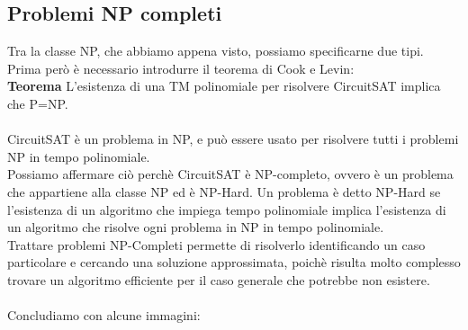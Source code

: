 \documentclass[]{article}
\begin{document}
		\subsection{Problemi NP completi}
			Tra la classe NP, che abbiamo appena visto, possiamo specificarne due tipi. Prima però è necessario introdurre il teorema di Cook e Levin:\\
			\textbf{Teorema} L'esistenza di una TM polinomiale per risolvere CircuitSAT implica che P=NP.\\\\
			CircuitSAT è un problema in NP, e può essere usato per risolvere tutti i problemi NP in tempo polinomiale.\\
			Possiamo affermare ciò perchè CircuitSAT è NP-completo, ovvero è un problema che appartiene alla classe NP ed è NP-Hard. Un problema è detto NP-Hard se l'esistenza di un algoritmo che impiega tempo polinomiale implica l'esistenza di un algoritmo che risolve ogni problema in NP in tempo polinomiale.\\
			Trattare problemi NP-Completi permette di risolverlo identificando un caso particolare e cercando una soluzione approssimata, poichè risulta molto complesso trovare un algoritmo efficiente per il caso generale che potrebbe non esistere.\\\\
			Concludiamo con alcune immagini:
\end{document}
